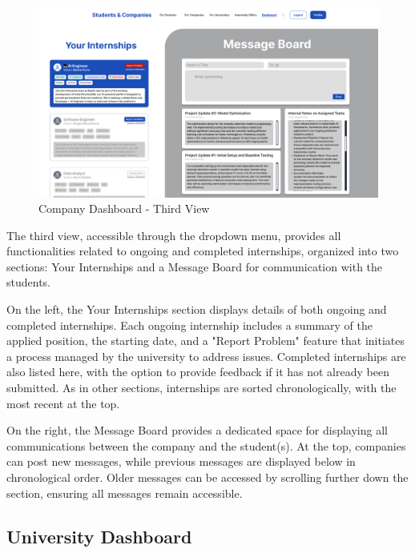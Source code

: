 \begin{figure} [H]
    \begin{center}
        \includegraphics[width=0.9\linewidth]{LaTeXCode/images/UI/Company Dashboard - Third View.png}
        \caption{Company Dashboard - Third View}
        \label{fig: dashboard_company_third}
    \end{center}
\end{figure}

The third view, accessible through the dropdown menu, provides all functionalities related to ongoing and completed internships, organized into two sections: Your Internships and a Message Board for communication with the students.

On the left, the Your Internships section displays details of both ongoing and completed internships. Each ongoing internship includes a summary of the applied position, the starting date, and a "Report Problem" feature that initiates a process managed by the university to address issues. Completed internships are also listed here, with the option to provide feedback if it has not already been submitted. As in other sections, internships are sorted chronologically, with the most recent at the top.

On the right, the Message Board provides a dedicated space for displaying all communications between the company and the student(s). At the top, companies can post new messages, while previous messages are displayed below in chronological order. Older messages can be accessed by scrolling further down the section, ensuring all messages remain accessible.

\subsection{University Dashboard}
\label{subsec: university_dashboard}

